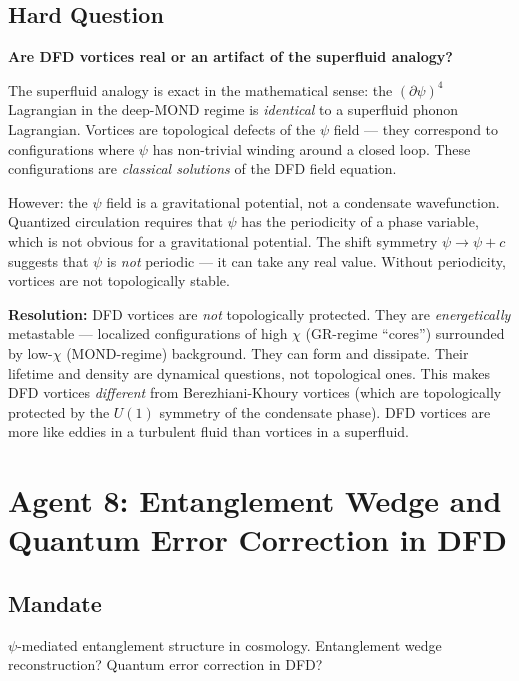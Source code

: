 \documentclass[11pt,a4paper]{article}
\begin{document}
\subsection{Hard Question}

\textbf{Are DFD vortices real or an artifact of the superfluid analogy?}

The superfluid analogy is exact in the mathematical sense: the $(\partial\psi)^4$ Lagrangian in the deep-MOND regime is \emph{identical} to a superfluid phonon Lagrangian. Vortices are topological defects of the $\psi$ field --- they correspond to configurations where $\psi$ has non-trivial winding around a closed loop. These configurations are \emph{classical solutions} of the DFD field equation.

However: the $\psi$ field is a gravitational potential, not a condensate wavefunction. Quantized circulation requires that $\psi$ has the periodicity of a phase variable, which is not obvious for a gravitational potential. The shift symmetry $\psi \to \psi + c$ suggests that $\psi$ is \emph{not} periodic --- it can take any real value. Without periodicity, vortices are not topologically stable.

\textbf{Resolution:} DFD vortices are \emph{not} topologically protected. They are \emph{energetically} metastable --- localized configurations of high $\chi$ (GR-regime ``cores'') surrounded by low-$\chi$ (MOND-regime) background. They can form and dissipate. Their lifetime and density are dynamical questions, not topological ones. This makes DFD vortices \emph{different} from Berezhiani-Khoury vortices (which are topologically protected by the $U(1)$ symmetry of the condensate phase). DFD vortices are more like eddies in a turbulent fluid than vortices in a superfluid.

\newpage
\section{Agent 8: Entanglement Wedge and Quantum Error Correction in DFD}
\label{sec:agent8}

\subsection{Mandate}

$\psi$-mediated entanglement structure in cosmology. Entanglement wedge reconstruction? Quantum error correction in DFD?
\end{document}
